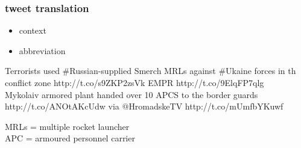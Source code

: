 \documentclass[12pt]{beamer}
\begin{document}
\begin{frame}
	\frametitle{tweet translation}
	\begin{itemize}
		\item \textcolor{TCTsilver}{\Large context}
		\item \textcolor{TCTsilver}{\Large abbreviation}
	\end{itemize}
\end{frame}


\begin{frame}
	\begin{center}
		Terrorists used \#Russian-supplied Smerch MRLs against \#Ukaine forces in th conflict zone http://t.co/s9ZKP2zsVk EMPR http://t.co/9ElqFP7qlg
		\\[0.7cm]
		Mykolaiv armored plant handed over 10 APCS  to the border guards  http://t.co/ANOtAKcUdw via $@$HromadskeTV http://t.co/mUmfbYKuwf
	\end{center}
	 {MRLs = multiple rocket launcher\\
	APC = armoured personnel carrier}
\end{frame}
\end{document}
